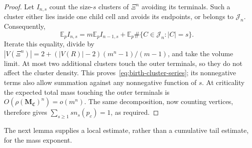 \begin{proof}
Let $I_{n,s}$ count the size-$s$ clusters of $\Xi^n$ avoiding its terminals.
Such a cluster either lies inside one child cell and avoids its endpoints, or belongs to $\mathcal J_n$.
Consequently,
\[
 \mathbb E_p I_{n,s}=m\mathbb E_p I_{n-1,s}
 +\mathbb E_p\#\{C\in\mathcal J_n:|C|=s\}.
\]
Iterate this equality, divide by
$|V(\Xi^n)|=2+(|V(R)|-2)(m^n-1)/(m-1)$, and take the volume limit.
At most two additional clusters touch the outer terminals, so they do not affect the cluster density.
This proves~\eqref{eq:birth-cluster-series}; its nonnegative terms also allow summation against any nonnegative function of $s$.
At criticality the expected total mass touching the outer terminals is $O(\rho(\mathbf M_{\mathfrak C})^n)=o(m^n)$.
The same decomposition, now counting vertices, therefore gives $\sum_{s\ge1}s n_s(p_c)=1$, as required.
\end{proof}

The next lemma supplies a local estimate, rather than a cumulative tail estimate, for the mass exponent.

